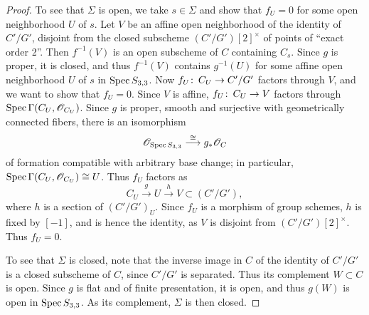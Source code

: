 \documentclass{gtpart}
\theoremstyle{definition}
\theoremstyle{remark}
\def\co{\colon\thinspace}
\newcommand{\Spec}{{\rm Spec\thinspace}}
\newcommand{\G}{\Gamma}
\newcommand{\s}{S_{3,3}}
\newcommand{\CO}{{\mathscr{O}}}
\begin{document}
\begin{proof}
 To see that $\Sigma$ is open, we take $s \in \Sigma$ and show that $f_U = 0$ for some open neighborhood $U$ of $s$.  
 Let $V$ be an affine open neighborhood of the identity of $C'/G'$, disjoint from the closed subscheme $(C'/G')[2]^\times$ of points of ``exact order 2''.  
 Then $f^{-1}(V)$ is an open subscheme of $C$ containing $C_s$.  
 Since $g$ is proper, it is closed, and thus $f^{-1}(V)$ contains $g^{-1}(U)$ for some affine open neighborhood $U$ of $s$ in $\Spec \s$.  
 Now $f_U \co C_U \to C'/G'$ factors through $V$, and we want to show that $f_U = 0$.  
 Since $V$ is affine, $f_U \co C_U \to V$ factors through $\Spec \G(C_U, \CO_{C_U})$.  
 Since $g$ is proper, smooth and surjective with geometrically connected fibers, there is an isomorphism 
 \[
  \CO_{\Spec \s} \stackrel{\cong}{\longrightarrow} g_*\CO_C 
 \]
 of formation compatible with arbitrary base change; in particular, $\Spec \G(C_U, \CO_{C_U}) \cong U$.  
 Thus $f_U$ factors as 
 \[
  C_U \stackrel{g}{\longrightarrow} U \stackrel{h}{\longrightarrow} V \subset (C'/G'), 
 \]
 where $h$ is a section of $(C'/G')_U$.  
 Since $f_U$ is a morphism of group schemes, $h$ is fixed by $[-1]$, and is hence the identity, as $V$ is disjoint from $(C'/G')[2]^\times$.  
 Thus $f_U = 0$.  

 To see that $\Sigma$ is closed, note that the inverse image in $C$ of the identity of $C'/G'$ is a closed subscheme of $C$, since $C'/G'$ is separated.  
 Thus its complement $W \subset C$ is open.  
 Since $g$ is flat and of finite presentation, it is open, and thus $g(W)$ is open in $\Spec \s$.  
 As its complement, $\Sigma$ is then closed.  
\end{proof}
\end{document}
